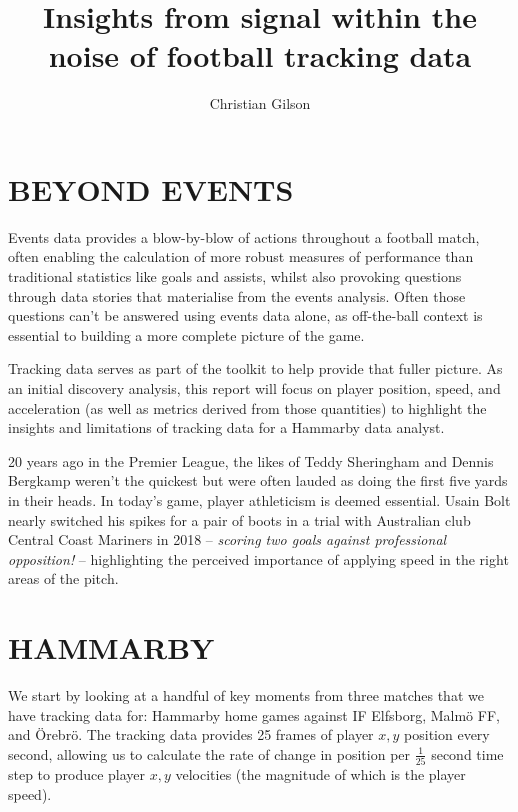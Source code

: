 \documentclass[twocolumn,prl,nobalancelastpage,aps,10pt]{revtex4-1}
\begin{document}
\title{Insights from signal within the noise of football tracking data}

\author{Christian Gilson}


\maketitle

\section{BEYOND EVENTS}

Events data provides a blow-by-blow of actions throughout a football match, often enabling the calculation of more robust measures of performance than traditional statistics like goals and assists, whilst also provoking questions through data stories that materialise from the events analysis. Often those questions can't be answered using events data alone, as off-the-ball context is essential to building a more complete picture of the game.

Tracking data serves as part of the toolkit to help provide that fuller picture. As an initial discovery analysis, this report will focus on player position, speed, and acceleration (as well as metrics derived from those quantities) to highlight the insights and limitations of tracking data for a Hammarby data analyst.

20 years ago in the Premier League, the likes of Teddy Sheringham and Dennis Bergkamp weren't the quickest but were often lauded as doing the first five yards in their heads. In today's game, player athleticism is deemed essential. Usain Bolt nearly switched his spikes for a pair of boots in a trial with Australian club Central Coast Mariners in 2018 -- \textit{scoring two goals against professional opposition!} -- highlighting the perceived importance of applying speed in the right areas of the pitch.

\section{HAMMARBY}
We start by looking at a handful of key moments from three matches that we have tracking data for: Hammarby home games against IF Elfsborg, Malm{\"o} FF, and {\"O}rebr{\"o}. The tracking data provides 25 frames of player $x,y$ position every second, allowing us to calculate the rate of change in position per $\frac{1}{25}$ second time step to produce player $x,y$ velocities (the magnitude of which is the player speed). 
\end{document}

